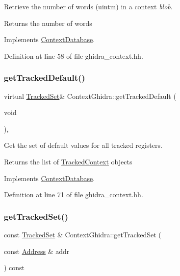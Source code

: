 Retrieve the number of words (uintm) in a context {\itshape blob}. 

\begin{DoxyReturn}{Returns}
the number of words 
\end{DoxyReturn}


Implements \mbox{\hyperlink{class_context_database_add56654146d3e6d9bab727980fd1da28}{Context\+Database}}.



Definition at line 58 of file ghidra\+\_\+context.\+hh.

\mbox{\label{class_context_ghidra_a7eca09e7b7d72d65669b91e79e16971b}} 
\subsubsection{\texorpdfstring{getTrackedDefault()}{getTrackedDefault()}}
{\footnotesize\ttfamily virtual \mbox{\hyperlink{globalcontext_8hh_a7559d2c55c5d12fbbaf0418733b62438}{Tracked\+Set}}\& Context\+Ghidra\+::get\+Tracked\+Default (\begin{DoxyParamCaption}\item[{void}]{ }\end{DoxyParamCaption})\hspace{0.3cm}{\ttfamily [inline]}, {\ttfamily [virtual]}}



Get the set of default values for all tracked registers. 

\begin{DoxyReturn}{Returns}
the list of \mbox{\hyperlink{struct_tracked_context}{Tracked\+Context}} objects 
\end{DoxyReturn}


Implements \mbox{\hyperlink{class_context_database_a08908cbaeb6c0a722e40f9392d9615bd}{Context\+Database}}.



Definition at line 71 of file ghidra\+\_\+context.\+hh.

\mbox{\label{class_context_ghidra_a4f6d11b1a9dd101791a11ee522139828}} 
\subsubsection{\texorpdfstring{getTrackedSet()}{getTrackedSet()}}
{\footnotesize\ttfamily const \mbox{\hyperlink{globalcontext_8hh_a7559d2c55c5d12fbbaf0418733b62438}{Tracked\+Set}} \& Context\+Ghidra\+::get\+Tracked\+Set (\begin{DoxyParamCaption}\item[{const \mbox{\hyperlink{class_address}{Address}} \&}]{addr }\end{DoxyParamCaption}) const\hspace{0.3cm}{\ttfamily [virtual]}}



